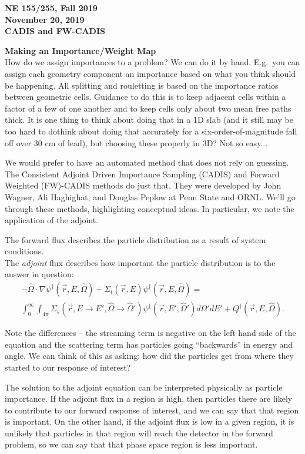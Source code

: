 \documentclass[12pt]{article}
\newcommand{\rvec}{\ensuremath{\vec{r}}}
\newcommand{\omvec}{\ensuremath{\hat{\Omega}}}
\begin{document}
\begin{center}
{\bf NE 155/255, Fall 2019\\
November 20, 2019 \\
CADIS and FW-CADIS
}
\end{center}

\textbf{Making an Importance/Weight Map}\\
How do we assign importances to a problem? We can do it by hand. E.g.\ you can
assign each geometry component an importance based on what you think should be
happening. All splitting and rouletting is based on the importance ratios
between geometric cells. Guidance to do this is to keep adjacent cells within a
factor of a few of one another and to keep cells only about two mean free paths
thick. It is one thing to think about doing that in a 1D slab (and it still may
be too hard to do\textemdash think about doing that accurately for a
six-order-of-magnitude fall off over 30 cm of lead), but choosing these
properly in 3D? Not so easy...

We would prefer to have an automated method that does not rely on guessing. The
Consistent Adjoint Driven Importance Sampling (CADIS) and Forward Weighted
(FW)-CADIS methods do just that. They were developed by John Wagner, Ali
Haghighat, and Douglas Peplow at Penn State and ORNL. We'll go through these
methods, highlighting conceptual ideas. In particular, we note the application of the adjoint.   

The forward flux describes the particle distribution as a result of system conditions. \\
The \textit{adjoint} flux describes how important the particle distribution is to the answer in question:
\begin{gather*}
-\omvec\cdot  \nabla \psi^{\dagger}(\rvec,E,\omvec) +
\Sigma_t(\rvec,E)\psi^{\dagger}(\rvec,E,\omvec) = \\
\int_0^{\infty}\int_{4\pi}
\Sigma_s(\rvec, E\rightarrow E',\omvec\rightarrow\omvec')
\psi^{\dagger}(\rvec,E',\omvec')d\omvec'dE'+Q^{\dagger}(\rvec, E, \omvec).
\end{gather*}

Note the differences -- the streaming term is negative on the left hand side of
the equation and the scattering term has particles going ``backwards'' in energy
and angle. We can think of this as asking: how did the particles get from where
they started to our response of interest?

The solution to the adjoint equation can be interpreted physically as particle
importance. If the adjoint flux in a region is high, then particles there are
likely to contribute to our forward response of interest, and we can say that
that region is important. On the other hand, if the adjoint flux is low in a
given region, it is unlikely that particles in that region will reach the
detector in the forward problem, so we can say that that phase space region is
less important.
\end{document}
